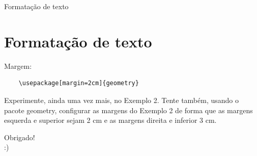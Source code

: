 \documentclass[12pt]{beamer}
\begin{document}
\begin{frame}[fragile]{Formatação de texto}
  \section{Formatação de texto}

  Margem:\\
  \begin{verbatim}
    \usepackage[margin=2cm]{geometry}
  \end{verbatim}
  
  Experimente, ainda uma vez mais, no Exemplo 2. Tente também, usando o pacote geometry, configurar as margens do Exemplo 2 de forma que as margens esquerda e superior sejam 2 cm e as margens direita e inferior 3 cm.

\end{frame}

\begin{frame}
  \begin{center}
    \large Obrigado!\\
    :)
  \end{center}
\end{frame}
\end{document}
